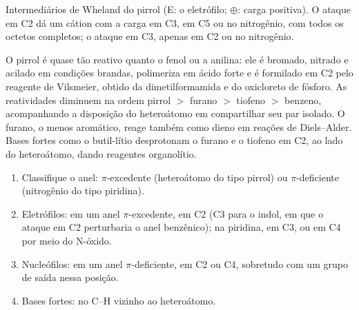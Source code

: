 \begin{omfigure}

{\small Intermediários de Wheland do pirrol (E: o eletrófilo; $\oplus$: carga positiva).
O ataque em C2 dá um cátion com a carga em C3, em C5 ou no nitrogênio, com todos os
octetos completos; o ataque em C3, apenas em C2 ou no nitrogênio.}
\end{omfigure}

O pirrol é quase tão reativo quanto o fenol ou a anilina: ele é bromado, nitrado
e acilado em condições brandas, polimeriza em ácido forte e é
formilado em C2 pelo reagente de Vilsmeier, obtido da dimetilformamida e do oxicloreto de
fósforo. As reatividades diminuem na ordem pirrol $>$ furano $>$ tiofeno $>$ benzeno,
acompanhando a disposição do heteroátomo em compartilhar seu par isolado. O furano,
o menos aromático, reage também como dieno em reações de Diels--Alder. Bases
fortes como o butil-lítio desprotonam o furano e o tiofeno em C2, ao lado do
heteroátomo, dando reagentes organolítio.

\begin{method}\label{met:b3:heterocycles:site}
\begin{enumerate}
  \item Classifique o anel: $\pi$-excedente (heteroátomo do tipo pirrol) ou $\pi$-deficiente
        (nitrogênio do tipo piridina).
  \item Eletrófilos: em um anel $\pi$-excedente, em C2 (C3 para o indol, em que o ataque em C2
        perturbaria o anel benzênico); na piridina, em C3, ou em C4 por meio do
        N-óxido.
  \item Nucleófilos: em um anel $\pi$-deficiente, em C2 ou C4, sobretudo com um grupo de saída
        nessa posição.
  \item Bases fortes: no C--H vizinho ao heteroátomo.
\end{enumerate}
\end{method}

